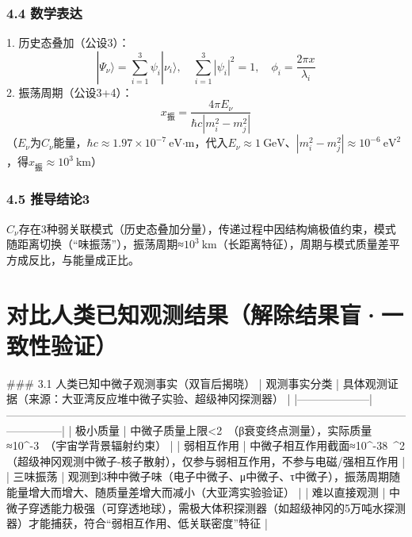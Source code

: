 \documentclass{article}
\begin{document}
\subsubsection{4.4 数学表达}
1. 历史态叠加（公设3）：  
   \[
   |\Psi_{\nu}\rangle = \sum_{i=1}^3 \psi_i|\nu_i\rangle, \quad \sum_{i=1}^3 |\psi_i|^2 = 1, \quad \phi_i = \frac{2\pi x}{\lambda_i}
   \]
2. 振荡周期（公设3+4）：  
   \[
   x_{\text{振}} = \frac{4\pi E_{\nu}}{\hbar c |m_i^2 - m_j^2|}
   \]
   （\(E_{\nu}\)为\(C_{\nu}\)能量，\(\hbar c≈1.97×10^{-7}\ \text{eV·m}\)，代入\(E_{\nu}≈1\ \text{GeV}\)、\(|m_i^2 - m_j^2|≈10^{-6}\ \text{eV}^2\)，得\(x_{\text{振}}≈10^3\ \text{km}\)）

\subsubsection{4.5 推导结论3}
\(C_{\nu}\)存在3种弱关联模式（历史态叠加分量），传递过程中因结构熵极值约束，模式随距离切换（“味振荡”），振荡周期≈\(10^3\ \text{km}\)（长距离特征），周期与模式质量差平方成反比，与能量成正比。


\section{对比人类已知观测结果（解除结果盲·一致性验证）}
### 3.1 人类已知中微子观测事实（双盲后揭晓）
| 观测事实分类       | 具体观测证据（来源：大亚湾反应堆中微子实验、超级神冈探测器）                                                                 |
|--------------------|---------------------------------------------------------------------------------------------------------------------------|
| 极小质量           | 中微子质量上限<2\ （β衰变终点测量），实际质量≈10^{-3}\ （宇宙学背景辐射约束）                          |
| 弱相互作用         | 中微子相互作用截面≈10^{-38}\ ^2（超级神冈观测中微子-核子散射），仅参与弱相互作用，不参与电磁/强相互作用            |
| 三味振荡           | 观测到3种中微子味（电子中微子、μ中微子、τ中微子），振荡周期随能量增大而增大、随质量差增大而减小（大亚湾实验验证）          |
| 难以直接观测       | 中微子穿透能力极强（可穿透地球），需极大体积探测器（如超级神冈的5万吨水探测器）才能捕获，符合“弱相互作用、低关联密度”特征 |
\end{document}

